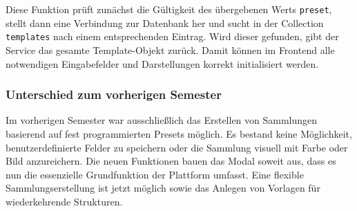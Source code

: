 Diese Funktion prüft zunächst die Gültigkeit des übergebenen Werts \texttt{preset}, stellt dann eine Verbindung zur Datenbank her und sucht in der Collection \texttt{templates} nach einem entsprechenden Eintrag.
Wird dieser gefunden, gibt der Service das gesamte Template-Objekt zurück.
Damit können im Frontend alle notwendigen Eingabefelder und Darstellungen korrekt initialisiert werden.

\subsubsection{Unterschied zum vorherigen Semester}\label{subsubsec:comparison-previous}

Im vorherigen Semester war ausschließlich das Erstellen von Sammlungen basierend auf fest programmierten Presets möglich.
Es bestand keine Möglichkeit, benutzerdefinierte Felder zu speichern oder die Sammlung visuell mit Farbe oder Bild anzureichern.
Die neuen Funktionen bauen das Modal soweit aus, dass es nun die essenzielle Grundfunktion der Plattform umfasst.
Eine flexible Sammlungserstellung ist jetzt möglich sowie das Anlegen von Vorlagen für wiederkehrende Strukturen.
